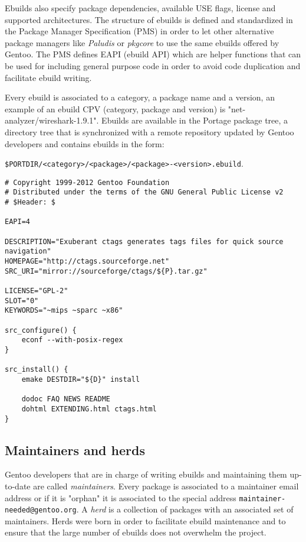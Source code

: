 Ebuilds also specify package dependencies, available USE flags, license and supported architectures.
The structure of ebuilds is defined and standardized in the Package Manager Specification (PMS) \cite{gentoo_pms} in order to let other alternative package managers like \emph{Paludis} or \emph{pkgcore} to use the same ebuilds offered by Gentoo. The PMS defines EAPI (ebuild API) which are helper functions that can be used for including general purpose code in order to avoid code duplication and facilitate ebuild writing.

Every ebuild is associated to a category, a package name and a version, an example of an ebuild CPV (category, package and version) is "net-analyzer/wireshark-1.9.1".
Ebuilds are available in the Portage package tree, a directory tree that is synchronized with a remote repository updated by Gentoo developers and contains ebuilds in the form:

\texttt{\$PORTDIR/<category>/<package>/<package>-<version>.ebuild}.


\vspace{0.5cm}
\lstset{language=bash, caption=Simplified ebuild for "Exuberant ctags", label=Example of an ebuild, numbers=left, stepnumber=2, frame=single, breaklines=true}
\begin{lstlisting}
# Copyright 1999-2012 Gentoo Foundation
# Distributed under the terms of the GNU General Public License v2
# $Header: $

EAPI=4

DESCRIPTION="Exuberant ctags generates tags files for quick source navigation"
HOMEPAGE="http://ctags.sourceforge.net"
SRC_URI="mirror://sourceforge/ctags/${P}.tar.gz"

LICENSE="GPL-2"
SLOT="0"
KEYWORDS="~mips ~sparc ~x86"

src_configure() {
    econf --with-posix-regex
}

src_install() {
    emake DESTDIR="${D}" install

    dodoc FAQ NEWS README
    dohtml EXTENDING.html ctags.html
}
\end{lstlisting}
\vspace{0.5cm}


\subsection{Maintainers and herds}
Gentoo developers that are in charge of writing ebuilds and maintaining them up-to-date are called \emph{maintainers}. Every package is associated to a maintainer email address or if it is "orphan" it is associated to the special address \texttt{maintainer-needed@gentoo.org}.
A \emph{herd} is a collection of packages with an associated set of maintainers. Herds were born in order to facilitate ebuild maintenance and to ensure that the large number of ebuilds does not overwhelm the project.


